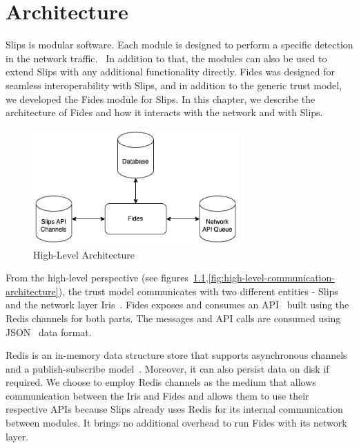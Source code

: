 \chapter{Architecture}
\label{ch:architecture}
Slips is modular software. Each module is designed to perform a specific detection in the network traffic.~\cite{slips}
In addition to that, the modules can also be used to extend Slips with any additional functionality directly. 
Fides was designed for seamless interoperability with Slips, and in addition to the generic trust model, we developed the Fides module for Slips.
In this chapter, we describe the architecture of Fides and how it interacts with the network and with Slips.

\begin{figure}[ht]
    \centering
    \includegraphics[width=0.7\textwidth]{assets/high_architecture.png}
    \caption{High-Level Architecture}
    \label{fig:high-level-architecture}
\end{figure}

From the high-level perspective (see figures~\ref{fig:high-level-architecture},\ref{fig:high-level-communication-architecture}), the trust model communicates with two different entities - Slips and the network layer Iris~\cite{nl}.
Fides exposes and consumes an API~\cite{api} built using the Redis channels for both parts.
The messages and API calls are consumed using JSON~\cite{json} data format.

Redis is an in-memory data structure store that supports asynchronous channels and a publish-subscribe model~\cite{redis}. Moreover, it can also persist data on disk if required.
We choose to employ Redis channels as the medium that allows communication between the Iris and Fides and allows them to use their respective APIs because Slips already uses Redis for its internal communication between modules. It brings no additional overhead to run Fides with its network layer.

